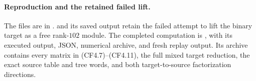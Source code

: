 \paragraph{Reproduction and the retained failed lift.}
The files are in .
 and its saved output retain
the failed attempt to lift the binary target as a free rank-$102$
module.  The completed computation is
, with its executed
output, JSON, numerical archive, and fresh replay output.
Its archive contains every matrix in (CF4.7)--(CF4.11), the full
mixed target reduction, the exact source table and tree words,
and both target-to-source factorization directions.
